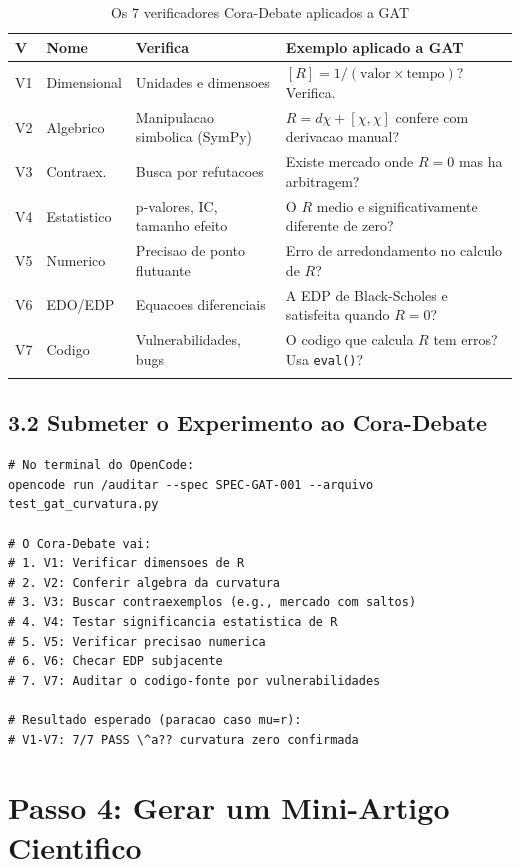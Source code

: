 \begin{center}
\begin{longtable}{p{}p{}p{}p{}}
\toprule
\textbf{V} & \textbf{Nome} & \textbf{Verifica} & \textbf{Exemplo aplicado a GAT} \\
\midrule
V1 & Dimensional & Unidades e dimensoes & $[R] = 1/(\text{valor}\times\text{tempo})$? Verifica. \\
V2 & Algebrico & Manipulacao simbolica (SymPy) & $R = d\chi + [\chi,\chi]$ confere com derivacao manual? \\
V3 & Contraex. & Busca por refutacoes & Existe mercado onde $R=0$ mas ha arbitragem? \\
V4 & Estatistico & p-valores, IC, tamanho efeito & O $R$ medio e significativamente diferente de zero? \\
V5 & Numerico & Precisao de ponto flutuante & Erro de arredondamento no calculo de $R$? \\
V6 & EDO/EDP & Equacoes diferenciais & A EDP de Black-Scholes e satisfeita quando $R=0$? \\
V7 & Codigo & Vulnerabilidades, bugs & O codigo que calcula $R$ tem erros? Usa \texttt{eval()}? \\
\bottomrule
\caption{Os 7 verificadores Cora-Debate aplicados a GAT}
\label{tab:cora_gat}
\end{longtable}
\end{center}

\subsection{3.2 Submeter o Experimento ao Cora-Debate}

\begin{lstlisting}[caption={Auditar experimento com Cora-Debate}, label=lst:cora]
# No terminal do OpenCode:
opencode run /auditar --spec SPEC-GAT-001 --arquivo test_gat_curvatura.py

# O Cora-Debate vai:
# 1. V1: Verificar dimensoes de R
# 2. V2: Conferir algebra da curvatura
# 3. V3: Buscar contraexemplos (e.g., mercado com saltos)
# 4. V4: Testar significancia estatistica de R
# 5. V5: Verificar precisao numerica
# 6. V6: Checar EDP subjacente
# 7. V7: Auditar o codigo-fonte por vulnerabilidades

# Resultado esperado (paracao caso mu=r):
# V1-V7: 7/7 PASS \^a?? curvatura zero confirmada
\end{lstlisting}

\section{Passo 4: Gerar um Mini-Artigo Cientifico}

